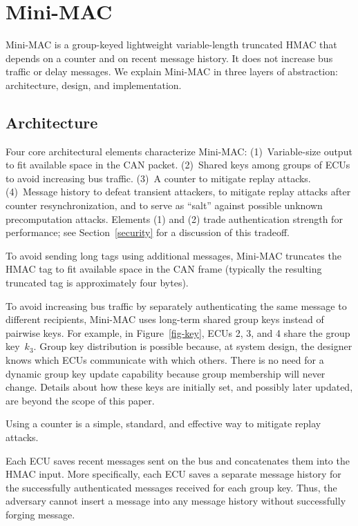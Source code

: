 \section{Mini-MAC}
\label{mini-mac}

Mini-MAC is a group-keyed lightweight variable-length truncated HMAC that
depends on a counter and on recent message history.  It does not increase
bus traffic or delay messages.  We explain Mini-MAC in three layers
of abstraction: architecture, design, and  implementation.

\subsection{Architecture}
\label{arch}

Four core architectural elements characterize Mini-MAC:
(1)~Variable-size output to fit available space in the CAN packet.
(2)~Shared keys among groups of ECUs to avoid increasing bus traffic.
(3)~A counter to mitigate replay attacks.
(4)~Message history to defeat transient attackers, 
to mitigate replay attacks after counter resynchronization, 
and to serve as ``salt'' against possible unknown precomputation attacks.
Elements (1) and (2) trade authentication strength for performance;  see
Section~\ref{security} for a discussion of this tradeoff.

To avoid sending long tags using additional messages, Mini-MAC truncates the
HMAC tag to fit available space in the CAN frame 
(typically the resulting truncated tag is approximately four bytes).  

To avoid increasing bus traffic by separately authenticating the same message to different recipients, 
Mini-MAC uses long-term shared group keys instead of pairwise keys.  For example, in Figure~\ref{fig-key}, ECUs
2, 3, and 4 share the group key~$k_3$.
Group key distribution is possible because, at system design, the designer knows which ECUs communicate with which others. 
There is no need for a dynamic group key update capability because group membership will never change.
Details about how these keys are initially set, and possibly later updated, 
are beyond the scope of this paper.


Using a counter is a simple, standard, and effective way to mitigate replay attacks.  

Each ECU saves recent messages sent on the bus and concatenates them into the HMAC input. 
More specifically, each ECU saves a separate message history for the 
successfully authenticated messages received for each group key.  Thus, the
adversary cannot insert a message into any message history without 
successfully forging message.

